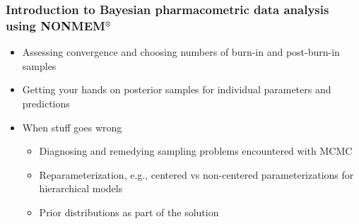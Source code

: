 \documentclass[handout]{beamer}
\begin{document}
\begin{frame}
  \frametitle{Introduction to Bayesian pharmacometric data analysis
    using NONMEM$^\text{\textregistered}$}
  
  \begin{itemize}
  \item Assessing convergence and choosing numbers of burn-in and
    post-burn-in samples
  \item Getting your hands on posterior samples for individual
    parameters and predictions
  \end{itemize}
  \begin{itemize}
  \item When stuff goes wrong
    \begin{itemize}
    \item Diagnosing and remedying sampling problems encountered with
      MCMC
    \item Reparameterization, e.g., centered vs non-centered
      parameterizations for hierarchical models
    \item Prior distributions as part of the solution
    \end{itemize}
  \end{itemize}

\end{frame}
\end{document}
